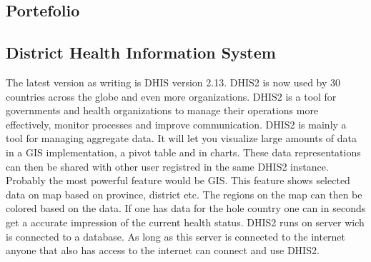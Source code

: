 \subsection{Portefolio}




\subsection{District Health Information System}

The latest version as writing is DHIS version 2.13.
DHIS2 is now used by 30 countries across the globe and even more organizations. DHIS2 is a tool for governments and health organizations to manage their operations more effectively, monitor processes and improve communication.
DHIS2 is mainly a tool for managing aggregate data. It will let you visualize large amounts of data in a GIS implementation, a pivot table and in charts. These data representations can then be shared with other user registred in the same DHIS2 instance.
Probably the most powerful feature would be GIS. This feature shows selected data on map based on province, district etc. The regions on the map can then be colored based on the data. 
If one has data for the hole country one can in seconds get  a accurate impression of the current health status. DHIS2 runs on server wich is connected to a database. As long as this server is connected to the internet anyone that also has access to the internet can connect and use DHIS2.
